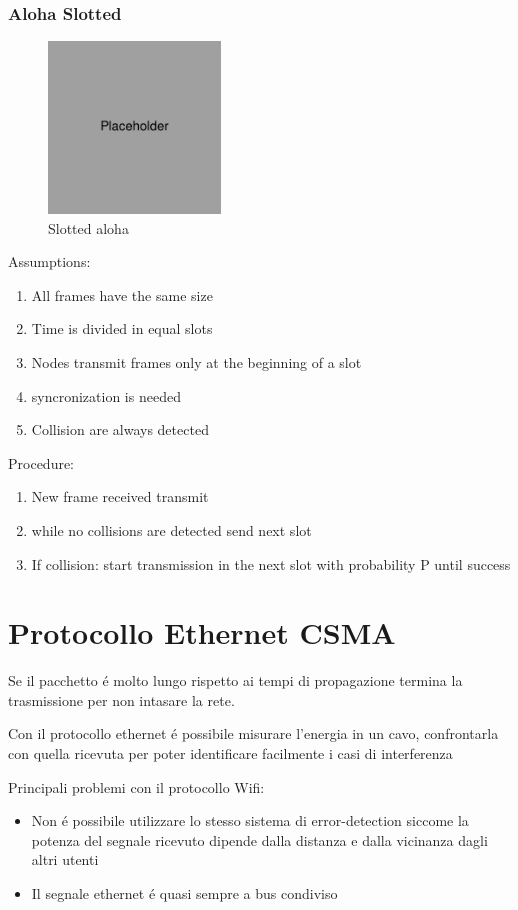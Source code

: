 \documentclass{article}
\begin{document}
\subsubsection{Aloha Slotted}
\begin{figure}[h]
    \centering
    \includegraphics[width=1.8in]{placeholder.jpg}
    \caption{Slotted aloha}
\end{figure}
Assumptions:
\begin{enumerate}
    \item All frames have the same size
    \item Time is divided in equal slots
    \item Nodes transmit frames only at the beginning of a slot
    \item syncronization is needed
    \item Collision are always detected
\end{enumerate}


Procedure:

\begin{enumerate}
    \item New frame received transmit
    \item while no collisions are detected send next slot
    \item If collision: start transmission in the next slot with probability P until success
\end{enumerate}
\hfill

\newpage
\section{Protocollo Ethernet CSMA}

Se il pacchetto \'e molto lungo rispetto ai tempi di propagazione termina la trasmissione per non intasare la rete.

Con il protocollo ethernet \'e possibile misurare l'energia in un cavo, confrontarla con quella ricevuta per poter identificare facilmente i casi di interferenza

Principali problemi con il protocollo Wifi:
\begin{itemize}
    \item Non \'e possibile utilizzare lo stesso sistema di error-detection siccome la potenza del segnale ricevuto dipende dalla distanza e dalla vicinanza dagli altri utenti
    \item Il segnale ethernet \'e quasi sempre a bus condiviso
\end{itemize}
\end{document}
